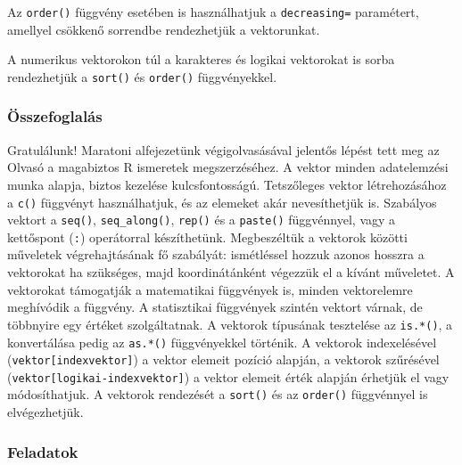 \documentclass[
]{book}
\makeatletter
\newenvironment{kframe}{%
\medskip{}
\setlength{\fboxsep}{.8em}
 \def\at@end@of@kframe{}%
 \ifinner\ifhmode%
  \def\at@end@of@kframe{\end{minipage}}%
  \begin{minipage}{\columnwidth}%
 \fi\fi%
 \def\FrameCommand##1{\hskip\@totalleftmargin \hskip-\fboxsep
 \colorbox{shadecolor}{##1}\hskip-\fboxsep
     \hskip-\linewidth \hskip-\@totalleftmargin \hskip\columnwidth}%
 \MakeFramed {\advance\hsize-\width
   \@totalleftmargin\z@ \linewidth\hsize
   \@setminipage}}%
 {\par\unskip\endMakeFramed%
 \at@end@of@kframe}
\newenvironment{rmdblock}[1]
  {
  \begin{itemize}
  \renewcommand{\labelitemi}{
    \raisebox{-.7\height}[0pt][0pt]{
      {\setkeys{Gin}{width=3em,keepaspectratio}\texttt{[image: images/\#1]}}
    }
  }
  \setlength{\fboxsep}{1em}
  \begin{kframe}
  \item
  }
  {
  \end{kframe}
  \end{itemize}
  }
\newenvironment{rmdsummary}
  {\begin{rmdblock}{summary}}
  {\end{rmdblock}}
\makeatother
\begin{document}
Az \texttt{order()} függvény esetében is használhatjuk a \texttt{decreasing=} paramétert, amellyel csökkenő sorrendbe rendezhetjük a vektorunkat.

A numerikus vektorokon túl a karakteres és logikai vektorokat is sorba rendezhetjük a \texttt{sort()} és \texttt{order()} függvényekkel.

\hypertarget{az-r-nyelv-5-summary}{%
\subsubsection{Összefoglalás}\label{az-r-nyelv-5-summary}}

\begin{rmdsummary}
Gratulálunk! Maratoni alfejezetünk végigolvasásával jelentős lépést tett
meg az Olvasó a magabiztos R ismeretek megszerzéséhez. A vektor minden
adatelemzési munka alapja, biztos kezelése kulcsfontosságú. Tetszőleges
vektor létrehozásához a \texttt{c()} függvényt használhatjuk, és az
elemeket akár nevesíthetjük is. Szabályos vektort a \texttt{seq()},
\texttt{seq\_along()}, \texttt{rep()} és a \texttt{paste()} függvénnyel,
vagy a kettőspont (\texttt{:}) operátorral készíthetünk. Megbeszéltük a
vektorok közötti műveletek végrehajtásának fő szabályát: ismétléssel
hozzuk azonos hosszra a vektorokat ha szükséges, majd koordinátánként
végezzük el a kívánt műveletet. A vektorokat támogatják a matematikai
függvények is, minden vektorelemre meghívódik a függvény. A statisztikai
függvények szintén vektort várnak, de többnyire egy értéket
szolgáltatnak. A vektorok típusának tesztelése az \texttt{is.*()}, a
konvertálása pedig az \texttt{as.*()} függvényekkel történik. A vektorok
indexelésével (\texttt{vektor{[}indexvektor{]}}) a vektor elemeit
pozíció alapján, a vektorok szűrésével
(\texttt{vektor{[}logikai-indexvektor{]}}) a vektor elemeit érték
alapján érhetjük el vagy módosíthatjuk. A vektorok rendezését a
\texttt{sort()} és az \texttt{order()} függvénnyel is elvégezhetjük.
\end{rmdsummary}

\hypertarget{az-r-nyelv-5-exercise}{%
\subsubsection{Feladatok}\label{az-r-nyelv-5-exercise}}
\end{document}
